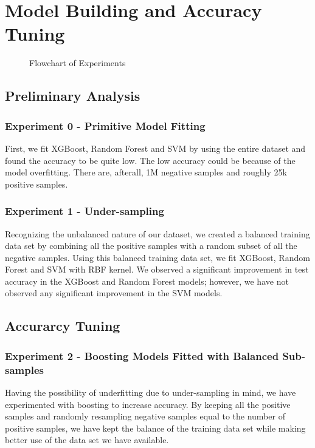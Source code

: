 \documentclass[10pt]{article}
\begin{document}
\section{Model Building and Accuracy Tuning}
\begin{figure}[H]
    \centering
    
    \caption{Flowchart of Experiments}
\end{figure}
\subsection{Preliminary Analysis}
\subsubsection{Experiment 0 - Primitive Model Fitting}
First, we fit XGBoost, Random Forest and SVM by using the entire dataset
and found the accuracy to be quite low. The low accuracy could be because
of the model overfitting. There are, afterall, 1M negative samples and
roughly 25k positive samples.\par
\subsubsection{Experiment 1 - Under-sampling}
Recognizing the unbalanced nature of our dataset, we created a balanced
training data set by combining all the positive samples with a random
subset of all the negative samples. Using this balanced training data set,
we fit XGBoost, Random Forest and SVM with RBF kernel. We observed a
significant improvement in test accuracy in the XGBoost and Random Forest
models; however, we have not observed any significant improvement in the
SVM models.\par
\begin{table}[H]
    \centering
    
\end{table}
\subsection{Accurarcy Tuning}
\subsubsection{Experiment 2 - Boosting Models Fitted with Balanced
               Sub-samples}
Having the possibility of underfitting due to under-sampling in mind, we
have experimented with boosting to increase accuracy. By keeping all the
positive samples and randomly resampling negative samples equal to the
number of positive samples, we have kept the balance of the training data
set while making better use of the data set we have available.\par
\end{document}
